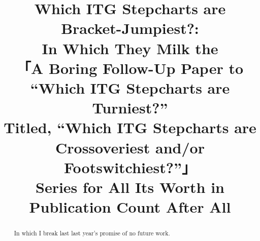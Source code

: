 \documentclass[10pt]{sigplanconf}
\begin{document}
\copyrightdata{}


\title{
Which ITG Stepcharts are Bracket-Jumpiest?: \\
In Which They Milk the \\
「A Boring Follow-Up Paper to \\
``Which ITG Stepcharts are Turniest?'' \\
Titled, ``Which ITG Stepcharts are Crossoveriest and/or Footswitchiest?''」\\
Series for All Its Worth in Publication Count After All \\
}


\maketitle

\begin{abstract}

In which I break last last year's promise of no future work.

\end{abstract}
\end{document}
